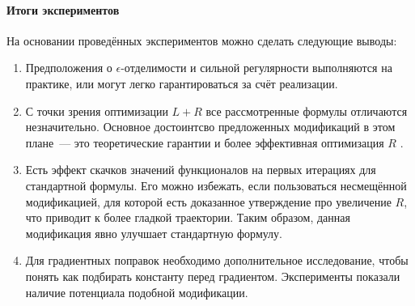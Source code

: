\documentclass[12pt, twoside]{article}
\begin{document}
\paragraph{Итоги экспериментов}
На основании проведённых экспериментов можно сделать следующие выводы:
\begin{enumerate}
\item Предположения о $\epsilon$-отделимости и сильной регулярности выполняются на практике, или могут легко гарантироваться за счёт реализации.
\item С точки зрения оптимизации $L + R$ все рассмотренные формулы отличаются незначительно. Основное достоинтсво предложенных модификаций в этом плане~--- это теоретические гарантии и более эффективная оптимизация $R$ .
\item Есть эффект скачков значений функционалов на первых итерациях для стандартной формулы. Его можно избежать, если пользоваться несмещённой модификацией, для которой есть доказанное утверждение про увеличение $R$, что приводит к более гладкой траектории. Таким образом, данная модификация явно улучшает стандартную формулу.
\item Для градиентных поправок необходимо дополнительное исследование, чтобы понять как подбирать константу перед градиентом. Эксперименты показали наличие потенциала подобной модификации.
\end{enumerate}
\end{document}
